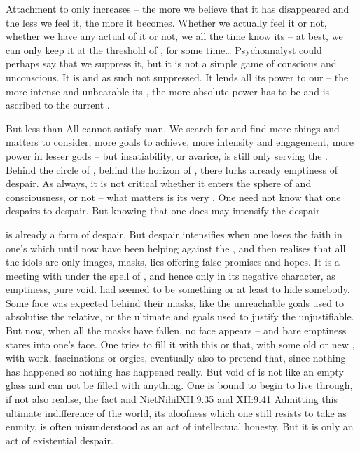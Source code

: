 
\label{sub:belial} %
{Attachment} to  only increases  -- the more we believe
that it has disappeared and the less we feel it, the more  it
becomes. Whether we actually feel it or not, whether we have any actual
 of it or not, we all the time know its  -- at best, we
can only keep it at the threshold of , for some time\ldots
Psychoanalyst could perhaps say that we suppress it, but it is not a simple game
of conscious and unconscious. It is  and as such not suppressed. It
lends all its power to our  -- the more intense and unbearable its
, the more absolute power has to be and is ascribed to the current
.

But less than All cannot satisfy man. We search for and find more things and
matters to consider, more 
goals to achieve, more intensity and engagement, more power in lesser gods --
but insatiability, or avarice, is still only serving the . Behind the
circle of , behind the horizon of , there lurks already
emptiness of despair. As always, it is not critical whether it enters the sphere
of  and consciousness, or not -- what matters is its very
. One need not know that one despairs to despair. But knowing that
one does may intensify the despair. 

\pa {} is already a form of despair. But despair intensifies when one
loses the faith in one's  which until
now have been helping against the , and then realises that all the
idols are only images, masks, lies offering false promises and hopes.
It is a meeting with  under the spell of , and
hence only in its negative character, as emptiness, pure void.  had
seemed to be something or at least to hide somebody. Some face was
expected behind their masks, like the unreachable goals used to absolutise the
relative, or the ultimate and  goals used to justify the
unjustifiable. But now, when all the masks have fallen, no face 
appears -- and bare emptiness stares into one's face. 
One tries to fill it with this or that, with some old or
new , with work, fascinations or orgies, eventually also to pretend
that, since  nothing has happened so nothing has happened
really. But void of  is not like an empty glass and can not be
filled with anything. One is bound to begin to live through, if not also
realise, the fact  and \citet{that all faith, all
  accepting as truth is by necessity a falsehood: for there is no 
  such thing as the true world.}{NietNihil}{XII:9.35 and XII:9.41
   }
Admitting this ultimate indifference of the world, its aloofness which one still
resists to take as enmity, 
is often misunderstood as an act of intellectual honesty. But it is only an
act of existential despair.

